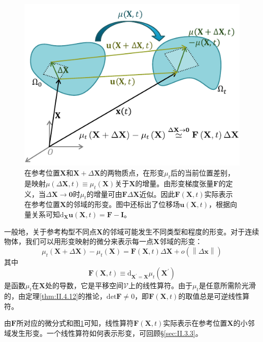 \documentclass[main.tex]{subfiles}
\begin{document}
\begin{figure}[ht]
    \centering
    \includegraphics{images/III.6.2.pdf}
    \caption{在参考位置$\mathbf{X}$和$\mathbf{X}+\Delta\mathbf{X}$的两物质点，在形变$\mu_t$后的当前位置差别，是映射$\mu\left(\Delta\mathbf{X},t\right)\equiv\mu_t\left(\mathbf{X}\right)$关于$\mathbf{X}$的增量。由形变梯度张量$\mathbf{F}$的定义，当$\Delta\mathbf{X}\to\mathbf{0}$时$\mu_t$的增量可由$\mathbf{F}\Delta\mathbf{X}$近似。因此$\mathbf{F}\left(\mathbf{X},t\right)$实际表示在参考位置$\mathbf{X}$的邻域的形变。图中还标出了位移场$\mathbf{u}\left(\mathbf{X},t\right)$，根据向量关系可知$\mathrm{d}_{\mathbf{X}}\mathbf{u}\left(\mathbf{X},t\right)=\mathbf{F}-\mathbf{I}$。}
    \label{fig:III.6.2}
\end{figure}

一般地，关于参考构型不同点$\mathbf{X}$的邻域可能发生不同类型和程度的形变。对于连续物体，我们可以用形变映射的微分来表示每一点$\mathbf{X}$邻域的形变：
\[\mu_t\left(\mathbf{X}+\Delta\mathbf{X}\right)-\mu_t\left(\mathbf{X}\right)=\mathbf{F}\left(\mathbf{X},t\right)\Delta\mathbf{X}+o\left(\left\|\Delta\mathbf{x}\right\|\right)\]
其中
\[\mathbf{F}\left(\mathbf{X},t\right)\equiv \mathrm{d}_{\mathbf{X}^\prime=\mathbf{X}}\mu_t\left(\mathbf{X}^\prime\right)\]
是函数$\mu_t$在$\mathbf{X}$处的导数，它是平移空间$\mathcal{V}$上的线性算符。由于$\mu_t$是任意所需阶光滑的，由定理\ref{thm:II.4.12}的推论，$\mathrm{det}\mathbf{F}\neq 0$，即$\mathbf{F}\left(\mathbf{X},t\right)$的取值总是可逆线性算符。

由$\mathbf{F}$所对应的微分式和图\ref{fig:III.6.2}可知，线性算符$\mathbf{F}\left(\mathbf{X},t\right)$实际表示在参考位置$\mathbf{X}$的小邻域发生形变。一个线性算符如何表示形变，可回顾\S\ref{sec:II.3.3}。
\end{document}
